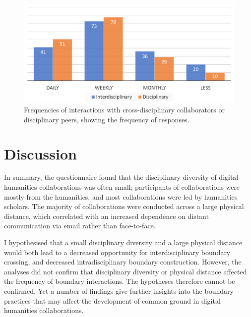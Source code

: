 \documentclass{article}
\begin{document}
\begin{figure}  
\begin{center}  
\includegraphics[width=1.0\linewidth]{barboundary.png}  
\caption{Frequencies of interactions with cross-disciplinary collaborators or disciplinary peers, showing the frequency of responses.\label{fig:barboundary}}  
\end{center}  
\end{figure}

\section{Discussion}

In summary, the questionnaire found that the disciplinary diversity of digital humanities collaborations was often small; participants of collaborations were mostly from the humanities, and most collaborations were led by humanities scholars.  
The majority of collaborations were conducted across a large physical distance, which correlated with an increased dependence on distant communication via email rather than face-to-face.

I hypothesised that a small disciplinary diversity and a large physical distance would both lead to a decreased opportunity for interdisciplinary boundary crossing, and decreased intradisciplinary boundary construction.
However, the analyses did not confirm that disciplinary diversity or physical distance affected the frequency of boundary interactions. The hypotheses therefore cannot be confirmed.
Yet a number of findings give further insights into the boundary practices that may affect the development of common ground in digital humanities collaborations.
\end{document}
